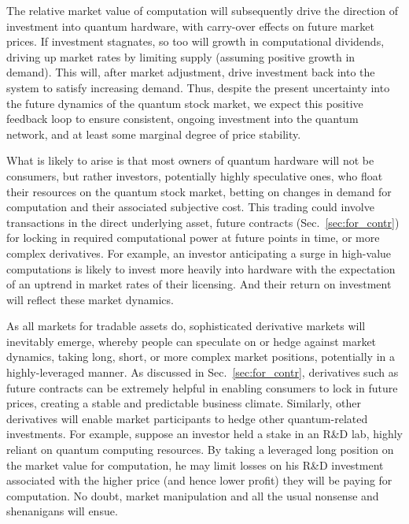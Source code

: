 The relative market value of computation will subsequently drive the direction of investment into quantum hardware, with carry-over effects on future market prices. If investment stagnates, so too will growth in computational dividends, driving up market rates by limiting supply (assuming positive growth in demand). This will, after market adjustment, drive investment back into the system to satisfy increasing demand. Thus, despite the present uncertainty into the future dynamics of the quantum stock market, we expect this positive feedback loop to ensure consistent, ongoing investment into the quantum network, and at least some marginal degree of price stability.

What is likely to arise is that most owners of quantum hardware will not be consumers, but rather investors, potentially highly speculative ones, who float their resources on the quantum stock market, betting on changes in demand for computation and their associated subjective cost. This trading could involve transactions in the direct underlying asset, future contracts (Sec.~\ref{sec:for_contr}) for locking in required computational power at future points in time, or more complex derivatives. For example, an investor anticipating a surge in high-value computations is likely to invest more heavily into hardware with the expectation of an uptrend in market rates of their licensing. And their return on investment will reflect these market dynamics.

As all markets for tradable assets do, sophisticated derivative markets will inevitably emerge, whereby people can speculate on or hedge against market dynamics, taking long, short, or more complex market positions, potentially in a highly-leveraged manner. As discussed in Sec.~\ref{sec:for_contr}, derivatives such as future contracts can be extremely helpful in enabling consumers to lock in future prices, creating a stable and predictable business climate. Similarly, other derivatives will enable market participants to hedge other quantum-related investments. For example, suppose an investor held a stake in an R\&D lab, highly reliant on quantum computing resources. By taking a leveraged long position on the market value for computation, he may limit losses on his R\&D investment associated with the higher price (and hence lower profit) they will be paying for computation. No doubt, market manipulation and all the usual nonsense and shenanigans will ensue.

%
%

